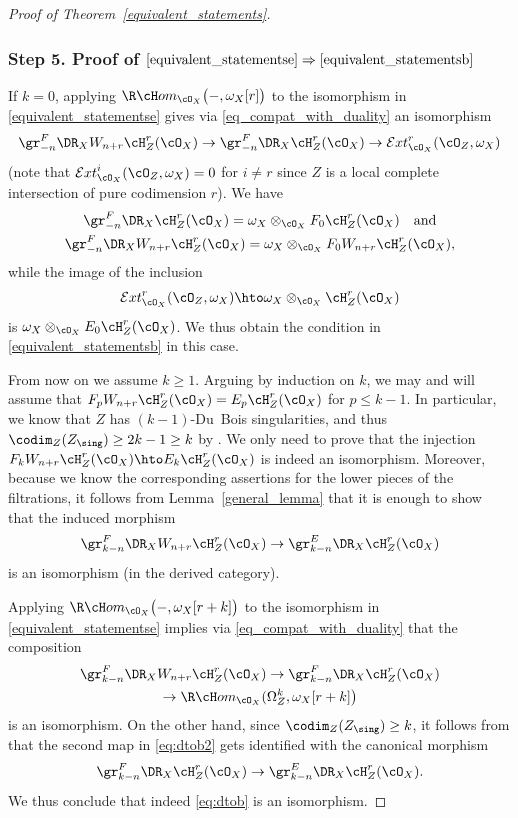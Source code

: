 \begin{proof}[Proof of Theorem~\ref{equivalent_statements}]
\subsubsection*{Step 5. Proof of $\eqref{equivalent_statementse}\Rightarrow\eqref{equivalent_statementsb}$}
If $k=0$, applying $\R\cH om_{\cO_X}\big(-,\omega_X[r]\big)$ to the isomorphism in \eqref{equivalent_statementse} gives via \eqref{eq_compat_with_duality} an isomorphism\vspace*{-3pt}
\[\gr^F_{-n}\DR_XW_{n+r}\cH^r_Z(\cO_X)\to \gr^F_{-n}\DR_X\cH^r_Z(\cO_X)\to {\mathcal Ext}^r_{\cO_X}(\cO_Z,\omega_X)\]
(note that ${\mathcal Ext}^i_{\cO_X}(\cO_Z,\omega_X)=0$ for $i\neq r$ since $Z$ is a local complete intersection of pure codimension $r$).
We have
\begin{gather*}
\gr^F_{-n}\DR_X\cH^r_Z(\cO_X)=\omega_X\otimes_{\cO_X}F_0\cH^r_Z(\cO_X)\quad\text{and}\\
\gr^F_{-n}\DR_XW_{n+r}\cH^r_Z(\cO_X)=\omega_X\otimes_{\cO_X}F_0W_{n+r}\cH^r_Z(\cO_X),
\end{gather*}
while the image of the inclusion
\[
{\mathcal Ext}^r_{\cO_X}(\cO_Z,\omega_X)\hto \omega_X\otimes_{\cO_X}\cH^r_Z(\cO_X)
\]
is
$\omega_X\otimes_{\cO_X}E_0\cH^r_Z(\cO_X)$. We thus obtain the condition in \eqref{equivalent_statementsb} in this case.

From now on we assume $k\geq 1$. Arguing by induction on $k$, we may and will assume that
$F_pW_{n+r}\cH^r_Z(\cO_X)=E_p\cH^r_Z(\cO_X)$ for $p\leq k-1$. In particular, we know that $Z$ has $(k-1)$-Du~Bois singularities, and thus
$\codim_Z(Z_\sing)\geq 2k-1\geq k$ by \cite[Cor.\,3.40]{MP1}.
We only need to prove that the injection $F_{k}W_{n+r}\cH^r_Z(\cO_X) \hto E_{k}\cH^r_Z(\cO_X)$ is indeed an isomorphism.
Moreover, because we know the corresponding assertions for the lower pieces of the filtrations, it follows from Lemma~\ref{general_lemma}
that it is enough to show that the induced morphism
\begin{equation}\label{eq:dtob}
\gr^F_{k-n} \DR_X W_{n+r}\cH^r_Z(\cO_X)\to \gr^E_{k-n} \DR_X \cH^r_Z(\cO_X)
\end{equation}
is an isomorphism (in the derived category).

Applying $\R\cH om_{\cO_X}\big(-,\omega_X[r+k]\big)$ to the isomorphism in \eqref{equivalent_statementse} implies via \eqref{eq_compat_with_duality} that the composition
\begin{multline}\label{eq:dtob2}
\gr^F_{k-n}\DR_XW_{n+r}\cH^r_Z(\cO_X)\to \gr^F_{k-n}\DR_X\cH^r_Z(\cO_X)\\
\to \R\cH om_{\cO_X}(\Omega_Z^k,\omega_X[r+k]\big)
\end{multline}
is an isomorphism. On the other hand, since $\codim_Z(Z_\sing)\geq k$, it follows from
\cite[\S 5.2]{MP1}
that the second map in \eqref{eq:dtob2} gets identified with the canonical morphism
\[\gr^F_{k-n}\DR_X\cH^r_Z(\cO_X)\to \gr^E_{k-n}\DR_X\cH^r_Z(\cO_X).\]
We thus conclude that indeed \eqref{eq:dtob} is an isomorphism.


\end{proof}
